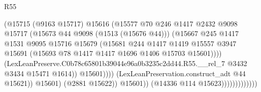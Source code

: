 \begin{lexlean}{R55}
\begin{coremodule}
{{                                              (@15715
                                                (@9163 @15717)
                                                @15616
                                                (@15577
                                                  @70
                                                  @246
                                                  @1417
                                                  @2432
                                                  @9098
                                                  @15717
                                                  (@15673 @44 @9098 (@1513 (@15676 @44)))
                                                  (@15667
                                                    @245
                                                    @1417
                                                    @1531
                                                    @9095
                                                    @15716
                                                    @15679
                                                    (@15681
                                                      @244
                                                      @1417
                                                      @1419
                                                      @15557
                                                      @3947
                                                      @15691
                                                      (@15693
                                                        @78
                                                        @1417
                                                        @1417
                                                        @1696
                                                        @1406
                                                        @15703
                                                        @15601))))
                                                (LexLeanPreserve.C0b78c65801b39044e96a0b3235c2dd44.R55.__rel_7
                                                  @3432
                                                  @3434
                                                  @15471
                                                  @1614))
                                              @15601))))
                                      (LexLeanPreservation.construct_adt @44 @15621))
                                    @15601)
                                  (@2881 @15622))
                                @15601))
                            (@14336 @114 @15623)))))))))))))
}}
\end{coremodule}
\end{lexlean}

